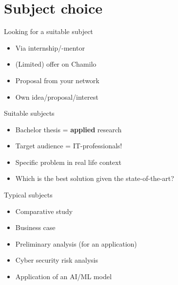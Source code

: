\documentclass[aspectratio=169]{beamer}
\begin{document}
    \section{Subject choice}
    
    \begin{frame}{Looking for a suitable subject}
        
        \begin{itemize}
            \item Via internship/-mentor
            \item (Limited) offer on Chamilo
            \item Proposal from your network 
            \item Own idea/proposal/interest
        \end{itemize}
        
        \bigskip
        
    \end{frame}
    
    \begin{frame}{Suitable subjects}
        
        \begin{itemize}
            \item Bachelor thesis = \textbf{applied} research
            \item Target audience = IT-professionals!
            \item Specific problem in real life context
            \item Which is the best solution given the state-of-the-art?
        \end{itemize}
        
        \bigskip
        
    \end{frame}
    
        
    \begin{frame}{Typical subjects}
        
        \begin{itemize}
            \item Comparative study
            \item Business case
            \item Preliminary analysis (for an application)
            \item Cyber security risk analysis 
            \item Application of an AI/ML model
        \end{itemize}
        
        \bigskip
        
    \end{frame}
    
\end{document}
